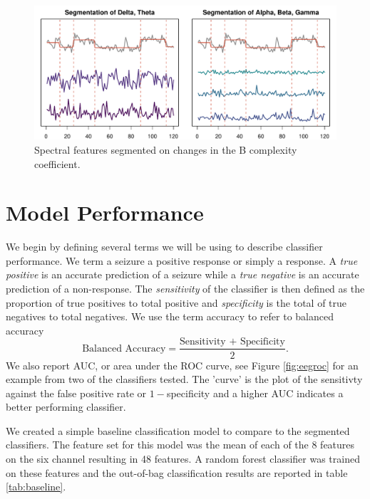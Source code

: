 \begin{figure}[!htbp]
  \begin{center}
  \includegraphics[width = \textwidth, keepaspectratio]{./figs/eeg-segment-plot.pdf}
  \end{center}
  \label{fig:segplot} 
  \caption{Spectral features segmented on changes in the B complexity coefficient.}
\end{figure}

\section{Model Performance}

We begin by defining several terms we will be using to describe classifier performance. We term a seizure a 
positive response or simply a response. A  
\textit{true positive}  
is an accurate prediction of a seizure while a 
 \textit{true negative} is an accurate prediction of a non-response. 
The  \textit{sensitivity} of the classifier is then 
defined as the proportion of true positives to total 
positive and  \textit{specificity} is the total of true 
negatives to total negatives. We use the term accuracy to refer to balanced accuracy
\[
  \text{Balanced Accuracy} = \frac{\text{Sensitivity + Specificity}}{2}.
\] 
We also report AUC, or area under the ROC curve, see 
Figure \ref{fig:eegroc} for an example from two 
of the classifiers tested. The 'curve' is the plot 
of the sensitivty against the false positive rate or 
$1 - $specificity and a higher AUC indicates a better performing classifier.

We created a simple baseline classification model to compare to the segmented classifiers. The feature set for this model was the mean of each of the 8 features on the six channel resulting in 48 features. A random forest classifier was trained on these features and the out-of-bag classification results are reported in table \ref{tab:baseline}.

